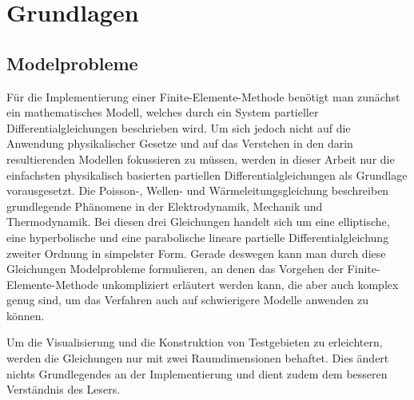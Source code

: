 \documentclass[crop=false]{standalone}
\begin{document}
  \section{Grundlagen} %
  \label{sec:background}

    \subsection{Modelprobleme} %
    \label{sub:modelprobleme}
      \newcommand{\domain}{\ensuremath{\Omega}}
      \newcommand{\boundary}{\ensuremath{\partial\domain}}
      \newcommand{\neumannBoundary}{\ensuremath{\boundary_\mathrm{N}}}
      \newcommand{\dirichletBoundary}{\ensuremath{\boundary_\mathrm{D}}}

      Für die Implementierung einer Finite-Elemente-Methode benötigt man zunächst ein mathematisches Modell, welches durch ein System partieller Differentialgleichungen beschrieben wird.
      Um sich jedoch nicht auf die Anwendung physikalischer Gesetze und auf das Verstehen in den darin resultierenden Modellen fokussieren zu müssen, werden in dieser Arbeit nur die einfachsten physikalisch basierten partiellen Differentialgleichungen als Grundlage vorausgesetzt.
      Die Poisson-, Wellen- und Wärmeleitungsgleichung beschreiben grundlegende Phänomene in der Elektrodynamik, Mechanik und Thermodynamik.
      Bei diesen drei Gleichungen handelt sich um eine elliptische, eine hyperbolische und eine parabolische lineare partielle Differentialgleichung zweiter Ordnung in simpelster Form.
      Gerade deswegen kann man durch diese Gleichungen Modelprobleme formulieren, an denen das Vorgehen der Finite-Elemente-Methode unkompliziert erläutert werden kann, die aber auch komplex genug sind, um das Verfahren auch auf schwierigere Modelle anwenden zu können.

      Um die Visualisierung und die Konstruktion von Testgebieten zu erleichtern, werden die Gleichungen nur mit zwei Raumdimensionen behaftet.
      Dies ändert nichts Grundlegendes an der Implementierung und dient zudem dem besseren Verständnis des Lesers.
\end{document}
